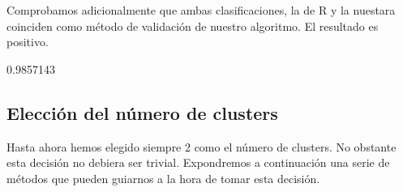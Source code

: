 \documentclass [a4paper] {article}
\begin{document}
Comprobamos adicionalmente que ambas clasificaciones, la de R y la nuestara coinciden como método de validación de nuestro algoritmo.
El resultado es positivo.
\begin{Schunk}
\begin{Soutput}
[1] 0.9857143
\end{Soutput}
\end{Schunk}

\newpage
\subsection{Elección del número de clusters}
Hasta ahora hemos elegido siempre 2 como el número de clusters.
No obstante esta decisión no debiera ser trivial.
Expondremos a continuación una serie de métodos que pueden guiarnos a la hora de tomar esta decisión.
\end{document}
